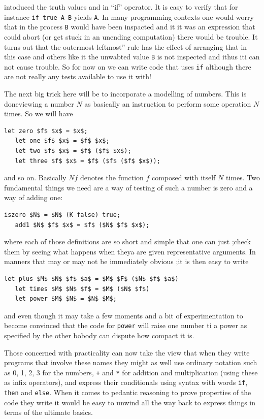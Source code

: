 intoduced the truth values and in ``if'' operator. It is easy to verify that
for instance \verb+if true A B+ yields \verb+A+. In many programming
contexts one would worry that in the process \verb+B+ would have been
inspacted and it it was an expression that could abort (or get stuck in an
unending computation) there would be trouble. It turns out that the
outermost-leftmost'' rule has the effect of arranging that in this case and
others like it the unwabted value \verb+B+ is not inspected and ithus iti
can not cause trouble. So for now on we can write code that uses \verb+if+
although there are not really any tests available to use it with!

The next big trick here will be to incorporate a modelling of numbers.
This is doneviewing a number $N$ as basically an instruction to
perform some operation $N$ times. So we will have
\begin{lstlisting}[mathescape=true]
   let zero $f$ $x$ = $x$;
   let one $f$ $x$ = $f$ $x$;
   let two $f$ $x$ = $f$ ($f$ $x$);
   let three $f$ $x$ = $f$ ($f$ ($f$ $x$));
\end{lstlisting}
and so on. Basically $N f$ denotes the function $f$ composed with itself $N$
times. Two fundamental things we need are a way of testing of such
a number is zero and a way of adding one:
\begin{lstlisting}[mathescape=true]
   iszero $N$ = $N$ (K false) true;
   add1 $N$ $f$ $x$ = $f$ ($N$ $f$ $x$);
\end{lstlisting}
where each of those definitions are so short and simple that one can just
;check them by seeing what happens when theya are given representative
arguments. In manners that may or may not be immediately obvious ;it is
then easy to write
\begin{lstlisting}[mathescape=true]
   let plus $M$ $N$ $f$ $a$ = $M$ $F$ ($N$ $f$ $a$)
   let times $M$ $N$ $f$ = $M$ ($N$ $f$)
   let power $M$ $N$ = $N$ $M$;
\end{lstlisting}
and even though it may take a few moments and a bit of experimentation to
become convinced that the code for \verb+power+ will raise one number ti
a power as specified by the other bobody can dispute how compact it is.

Those concerned with practicality can now take the view that when they write
programs that involve these names they might as well use ordinary notation
such as 0, 1, 2, 3 for the numbers, \verb/+/ and \verb/*/ for addition
and multiplication (using these as infix operators), and express their
conditionals using syntax with words \verb+if+, \verb+then+ and \verb+else+.
When it comes to pedantic reasoning to prove properties of the code they
write it would be easy to unwind all the way back to express things in terms
of the ultimate basics.

